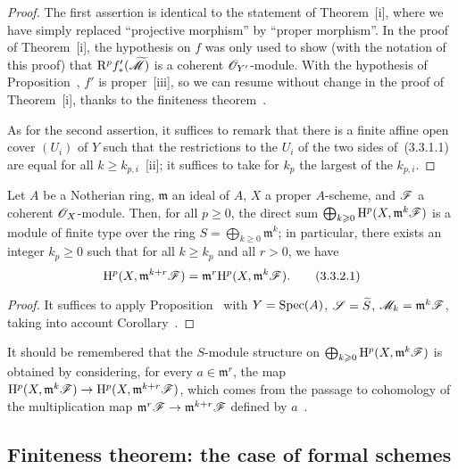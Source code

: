 \begin{proof}
\label{proof-3.3.3.1}
The first assertion is identical to the statement of Theorem~[i], where we have simply replaced ``projective morphism'' by ``proper morphism''.
In the proof of Theorem~[i], the hypothesis on $f$ was only used to show (with the notation of this proof) that $\mathrm{R}^p f_*'({\widetilde{\mathscr{M}}})$ is a coherent $\mathscr{O}_{Y'}$-module.
With the hypothesis of Proposition~, $f'$ is proper~[iii], so we can resume without change in the proof of Theorem~[i], thanks to the finiteness theorem~.

As for the second assertion, it suffices to remark that there is a finite affine open cover $(U_i)$ of $Y$ such that the restrictions to the $U_i$ of the two sides of~(3.3.1.1) are equal for all $k\geq k_{p,i}$~[ii]; it suffices to take for $k_p$ the largest of the $k_{p,i}$.
\end{proof}

\begin{corollary}[3.3.2]
\label{3.3.3.2}
Let $A$ be a Notherian ring, $\mathfrak{m}$ an ideal of $A$, $X$ a proper $A$-scheme, and $\mathscr{F}$ a coherent $\mathscr{O}_X$-module.
Then, for all $p\geq 0$, the direct sum $\bigoplus_{k\geqslant 0}\mathrm{H}^p(X,\mathfrak{m}^k\mathscr{F})$ is a module of finite type over the ring $S=\bigoplus_{k\geq 0}\mathfrak{m}^k$; in particular, there exists an integer $k_p\geq 0$ such that for all $k\geq k_p$ and all $r>0$, we have
\[
\label{3.3.3.2.1}
  \mathrm{H}^p(X,\mathfrak{m}^{k+r}\mathscr{F})=\mathfrak{m}^r\mathrm{H}^p(X,\mathfrak{m}^k\mathscr{F}).
  \tag{3.3.2.1}
\]
\end{corollary}

\begin{proof}
\label{proof-3.3.3.2}
It suffices to apply Proposition~ with $Y=\operatorname{Spec}(A)$, $\mathscr{S}={\widetilde{S}}$, $\mathscr{M}_k=\mathfrak{m}^k\mathscr{F}$, taking into account Corollary~.
\end{proof}

It should be remembered that the $S$-module structure on $\bigoplus_{k\geqslant 0}\mathrm{H}^p(X,\mathfrak{m}^k\mathscr{F})$ is obtained by considering, for every $a\in\mathfrak{m}^r$, the map $\HH^p(X,\mathfrak{m}^k\sh{F})\to\HH^p(X,\mathfrak{m}^{k+r}\sh{F})$, which comes from the passage to cohomology of the multiplication map $\mathfrak{m}^r\sh{F}\to\mathfrak{m}^{k+r}\sh{F}$ defined by $a$~.

\subsection{Finiteness theorem: the case of formal schemes}
\label{subsection:3.3.4}

